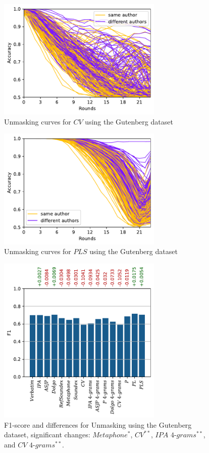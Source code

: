 \begin{figure}
  \centering
  \includegraphics[width=0.7\textwidth]{figures/cv_curves}
  \caption{Unmasking curves for $CV$ using the Gutenberg dataset}
  \label{fig:cv_curves}
\end{figure}
\begin{figure}
  \centering
  \includegraphics[width=0.7\textwidth]{figures/pls_curves}
  \caption{Unmasking curves for $PLS$ using the Gutenberg dataset}
  \label{fig:pls_curves}
\end{figure}
\begin{figure}
  \centering
  \includegraphics[width=0.7\textwidth]{figures/results_f1_gb_unmasking}
  \caption{F1-score and differences for Unmasking using the Gutenberg dataset, significant changes: $Metaphone^{*}$, $CV^{*\! *}$, $IPA$ $4$-$grams^{*\! *}$, and $CV$ $4$-$grams^{*\! *}$.}
  \label{fig:results_f1_gb_unmasking}
\end{figure}
